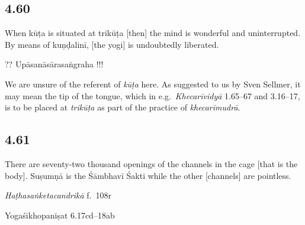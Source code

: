 \begin{ekdosis}

\subsection*{4.60}
\begin{translation}[hp04_060]
When kūṭa is situated at trikūṭa [then] the mind is wonderful and uninterrupted. By means of kuṇḍalinī, [the yogi] is undoubtedly liberated.
\end{translation}


\begin{testimonia}[hp04_060]
?? Upāsanāsārasaṅgraha !!!
\end{testimonia}

\begin{philcomm}[hp04_060]
We are unsure of the referent of \emph{kūṭa} here. As suggested to us by Sven Sellmer, it may mean the tip of the tongue, which in e.g.~\emph{Khecarīvidyā} 1.65–67 and 3.16–17, is to be placed at \emph{trikūṭa} as part of the practice of \emph{khecarīmudrā}.
\end{philcomm}

\subsection*{4.61}
\begin{translation}[hp04_061]
There are seventy-two thousand openings  of the channels in the cage [that is the body]. Suṣumṇā is the Śāmbhavī Śakti while the other [channels] are pointless.
\end{translation}


\begin{testimonia}[hp04_061]
\emph{Haṭhasaṅketacandrikā} f.~108r
\begin{versinnote}
\end{versinnote}

Yogaśikhopaniṣat 6.17cd–18ab
\begin{versinnote}
\end{versinnote}
\end{testimonia}


\end{ekdosis}
